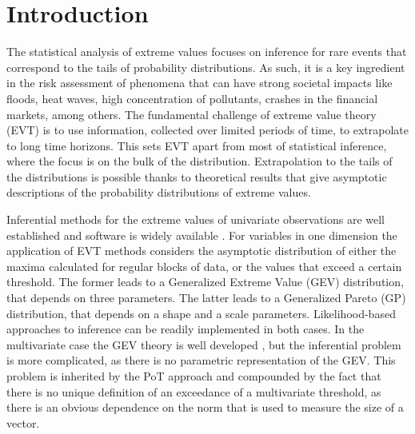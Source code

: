 
\section{Introduction}

The statistical analysis of extreme values focuses on inference for
rare events that correspond to the tails of probability distributions.
As such, it is a key ingredient in the risk assessment of
phenomena that can have strong societal impacts like floods, heat waves,
high concentration of pollutants, crashes in the financial markets,
among others. The fundamental challenge of extreme value theory (EVT) is
to use information, collected over limited periods of time, to
extrapolate to long time horizons. This sets EVT apart from most of
statistical inference, where the focus is on the bulk of the
distribution. Extrapolation to the tails of the distributions is
possible thanks to theoretical results that give asymptotic descriptions
of the probability distributions of extreme values. 

Inferential methods for the extreme values of univariate observations
are well established and software is widely available \cite[see, for example,][]{coles2001}. For variables in one dimension the application of EVT methods considers the asymptotic distribution of either the maxima calculated for regular blocks of data, or the values that exceed a certain threshold. The former leads to a Generalized Extreme Value (GEV) distribution, that depends on three parameters. The latter leads to a Generalized Pareto (GP) distribution, that depends on a shape and a scale parameters. Likelihood-based approaches to inference can be readily implemented in both cases.
In the multivariate case the GEV theory is well developed \citep[see, for example][]{dehaan2006}, but the inferential problem is more complicated, as there is no parametric representation of the GEV. This problem is inherited by the PoT approach and compounded by the fact that there is no unique definition of an exceedance of a multivariate threshold, as there is an obvious dependence on the norm that is used to measure the size of a vector. 

